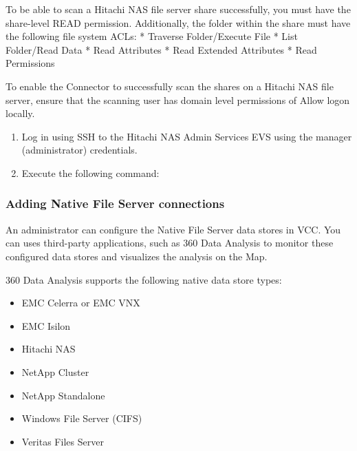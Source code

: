 \documentclass[letterpaper,10pt,english]{sphinxmanual}
\begin{document}
To be able to scan a Hitachi NAS file server share successfully, you must have the share-level READ permission. Additionally, the folder within the share must have
the following file system ACLs:
* Traverse Folder/Execute File
* List Folder/Read Data
* Read Attributes
* Read Extended Attributes
* Read Permissions

To enable the Connector to successfully scan the shares on a Hitachi NAS file server, ensure that the scanning user has domain level permissions of Allow logon
locally.

\begin{enumerate}
\item {} 
Log in using SSH to the Hitachi NAS Admin Services EVS using the manager (administrator) credentials.

\item {} 
Execute the following command:

\end{enumerate}



\subsubsection{Adding Native File Server connections}
\label{\detokenize{mcdmp_app_ug:adding-native-file-server-connections}}
An administrator can configure the Native File Server data stores in VCC. You can uses third-party applications, such as 360 Data Analysis to monitor these configured data stores and visualizes the analysis on the Map.

360 Data Analysis supports the following native data store types:
\begin{itemize}
\item {} 
EMC Celerra or EMC VNX

\item {} 
EMC Isilon

\item {} 
Hitachi NAS

\item {} 
NetApp Cluster

\item {} 
NetApp Standalone

\item {} 
Windows File Server (CIFS)

\item {} 
Veritas Files Server

\end{itemize}
\end{document}
